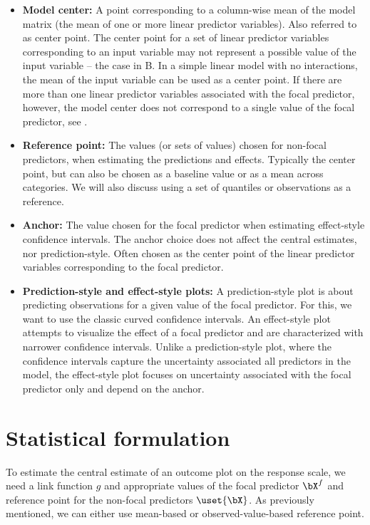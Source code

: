 \begin{itemize}
\item \textbf{Model center:} A point corresponding to a column-wise mean of the model matrix (the mean of one or more linear predictor variables). Also referred to as center point. The center point for a set of linear predictor variables corresponding to an input variable may not represent a possible value of the input variable -- the case in B. In a simple linear model with no interactions, the mean of the input variable can be used as a center point. If there are more than one linear predictor variables associated with the focal predictor, however, the model center does not correspond to a single value of the focal predictor, see .


\item \textbf{Reference point:} The values (or sets of values) chosen for non-focal predictors, when estimating the predictions and effects. Typically the center point, but can also be chosen as a baseline value or as a mean across categories. We will also discuss using a set of quantiles or observations as a reference.

\item \textbf{Anchor:} The value chosen for the focal predictor when estimating effect-style confidence intervals. The anchor choice does not affect the central estimates, nor prediction-style. Often chosen as the center point of the linear predictor variables corresponding to the focal predictor. 

\item \textbf{Prediction-style and effect-style plots:} A prediction-style plot is about predicting observations for a given value of the focal predictor. For this, we want to use the classic curved confidence intervals. An effect-style plot attempts to visualize the effect of a focal predictor and are characterized with narrower confidence intervals. Unlike a prediction-style plot, where the confidence intervals capture the uncertainty associated all predictors in the model, the effect-style plot focuses on uncertainty associated with the focal predictor only and depend on the anchor.

\end{itemize}

\section{Statistical formulation}

To estimate the central estimate of an outcome plot on the response scale, we need a link function $g$ and appropriate values of the focal predictor $\bX^{f}$ and reference point for the non-focal predictors $\uset{{\bX}}$. As previously mentioned, we can either use mean-based or observed-value-based reference point. 

